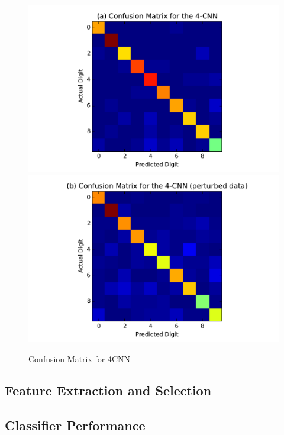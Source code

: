 \documentclass[conference]{IEEEtran}
\begin{document}
\begin{figure}[h]
	\centering
	\includegraphics[scale=0.5]{4CNN_confusion.pdf}
	\includegraphics[scale=0.5]{4CNN_perturbed_confusion.pdf}
	\caption{Confusion Matrix for 4CNN}
	\label{4CNN_confusion}
\end{figure}


\subsection{Feature Extraction and Selection}



\subsection{Classifier Performance}
\end{document}
